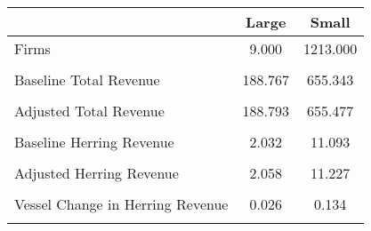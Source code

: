 \begin{tabular}{l*{2}{c}}
\hline\hline
                &    Large&    Small\\
\hline
Firms           &    9.000& 1213.000\\
                &         &         \\
Baseline Total Revenue&  188.767&  655.343\\
                &         &         \\
Adjusted Total Revenue&  188.793&  655.477\\
                &         &         \\
Baseline Herring Revenue&    2.032&   11.093\\
                &         &         \\
Adjusted Herring Revenue&    2.058&   11.227\\
                &         &         \\
Vessel Change in Herring Revenue&    0.026&    0.134\\
                &         &         \\
\hline\hline
\end{tabular}
